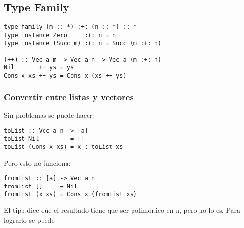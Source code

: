 \documentclass{article}
\begin{document}
\subsection{Type Family}

\begin{lstlisting}
type family (m :: *) :+: (n :: *) :: * 
type instance Zero     :+: n = n
type instance (Succ m) :+: n = Succ (m :+: n)

(++) :: Vec a m -> Vec a n -> Vec a (m :+: n)
Nil       ++ ys = ys
Cons x xs ++ ys = Cons x (xs ++ ys)
\end{lstlisting}

\subsubsection{Convertir entre listas y vectores}

Sin problemas se puede hacer:
\begin{lstlisting}
toList :: Vec a n -> [a]
toList Nil         = []
toList (Cons x xs) = x : toList xs
\end{lstlisting}
Pero esto no funciona:
\begin{lstlisting}
fromList :: [a] -> Vec a n
fromList []     = Nil
fromList (x:xs) = Cons x (fromList xs)
\end{lstlisting}
El tipo dice que el resultado tiene que ser polimórfico en n, pero no lo es. Para lograrlo se puede
\end{document}
